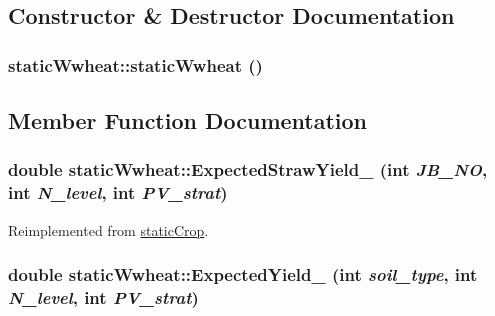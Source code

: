 \subsection{Constructor \& Destructor Documentation}
\hypertarget{classstatic_wwheat_a7d9fa03e51dd0478f91de605deea2606}{
\subsubsection[{staticWwheat}]{\setlength{\rightskip}{0pt plus 5cm}staticWwheat::staticWwheat ()}}
\label{classstatic_wwheat_a7d9fa03e51dd0478f91de605deea2606}


\subsection{Member Function Documentation}
\hypertarget{classstatic_wwheat_aca3709bba8050b2888a4f1d7f034309d}{
\subsubsection[{ExpectedStrawYield\_\-}]{\setlength{\rightskip}{0pt plus 5cm}double staticWwheat::ExpectedStrawYield\_\- (int {\em JB\_\-NO}, \/  int {\em N\_\-level}, \/  int {\em PV\_\-strat})}}
\label{classstatic_wwheat_aca3709bba8050b2888a4f1d7f034309d}


Reimplemented from \hyperlink{classstatic_crop_a884a8335aebc5effa3fecdb75af3ca85}{staticCrop}.\hypertarget{classstatic_wwheat_a2a711b3d2779a34f6b8b95d12e8166fd}{
\subsubsection[{ExpectedYield\_\-}]{\setlength{\rightskip}{0pt plus 5cm}double staticWwheat::ExpectedYield\_\- (int {\em soil\_\-type}, \/  int {\em N\_\-level}, \/  int {\em PV\_\-strat})}}
\label{classstatic_wwheat_a2a711b3d2779a34f6b8b95d12e8166fd}


